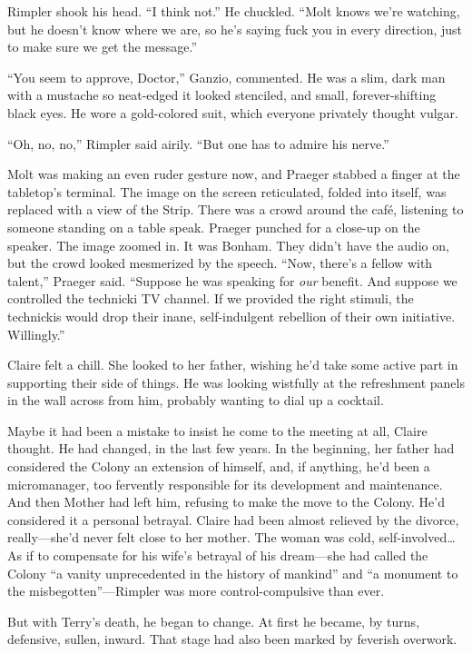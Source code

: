 Rimpler shook his head. ``I think not.'' He chuckled. ``Molt knows we're watching, but he doesn't know where we are, so he's saying fuck you in every direction, just to make sure we get the message.''

``You seem to approve, Doctor,'' Ganzio, commented. He was a slim, dark man with a mustache so neat-edged it looked stenciled, and small, forever-shifting black eyes. He wore a gold-colored suit, which everyone privately thought vulgar.

``Oh, no, no,'' Rimpler said airily. ``But one has to admire his nerve.''

Molt was making an even ruder gesture now, and Praeger stabbed a finger at the tabletop's terminal. The image on the screen reticulated, folded into itself, was replaced with a view of the Strip. There was a crowd around the café, listening to someone standing on a table speak. Praeger punched for a close-up on the speaker. The image zoomed in. It was Bonham. They didn't have the audio on, but the crowd looked mesmerized by the speech. ``Now, there's a fellow with talent,'' Praeger said. ``Suppose he was speaking for \textit{our} benefit. And suppose we controlled the technicki TV channel. If we provided the right stimuli, the technickis would drop their inane, self-indulgent rebellion of their own initiative. Willingly.''

Claire felt a chill. She looked to her father, wishing he'd take some active part in supporting their side of things. He was looking wistfully at the refreshment panels in the wall across from him, probably wanting to dial up a cocktail.

Maybe it had been a mistake to insist he come to the meeting at all, Claire thought. He had changed, in the last few years. In the beginning, her father had considered the Colony an extension of himself, and, if anything, he'd been a micromanager, too fervently responsible for its development and maintenance. And then Mother had left him, refusing to make the move to the Colony. He'd considered it a personal betrayal. Claire had been almost relieved by the divorce, really---she'd never felt close to her mother. The woman was cold, self-involved\ldots As if to compensate for his wife's betrayal of his dream---she had called the Colony ``a vanity unprecedented in the history of mankind'' and ``a monument to the misbegotten''---Rimpler was more control-compulsive than ever.

But with Terry's death, he began to change. At first he became, by turns, defensive, sullen, inward. That stage had also been marked by feverish overwork.

